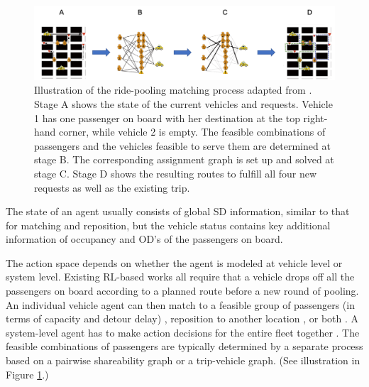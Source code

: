 \documentclass{article}
\newcommand{\tq}[1]{\textcolor{red}{#1}}
\begin{document}
\begin{figure}
\begin{center}
        \includegraphics[width=1.0\linewidth]{img/pool_match.png}
	\caption{Illustration of the ride-pooling matching process adapted from \citep{alonso2017demand}. Stage A shows the state of the current vehicles and requests. Vehicle 1 has one passenger on board with her destination at the top right-hand corner, while vehicle 2 is empty. The feasible combinations of passengers and the vehicles feasible to serve them are determined at stage B. The corresponding assignment graph is set up and solved at stage C. Stage D shows the resulting routes to fulfill all four new requests as well as the existing trip.}
	\label{fig:pool_match}
\end{center}
\end{figure}

The state of an agent usually consists of global SD information, similar to that for matching and reposition, but the vehicle status contains key additional information of occupancy and OD's of the passengers on board.

The action space depends on whether the agent is modeled at vehicle level or system level. Existing RL-based works all require that a vehicle drops off all the passengers on board according to a planned route before a new round of pooling. An individual vehicle agent can then match to a feasible group of passengers (in terms of capacity and detour delay) \citep{jindal2018optimizing}, reposition to another location \citep{al2019deeppool,haliem2020dprs,haliem2020distributed}, or both \citep{gueriau2018samod}. A system-level agent has to make action decisions for the entire fleet together \citep{yu2019integrated,shah2020neural}. The feasible combinations of passengers are typically determined by a separate process based on a pairwise shareability graph or a trip-vehicle graph\citep{alonso2017demand}. (See illustration in Figure \ref{fig:pool_match}.)
\end{document}
